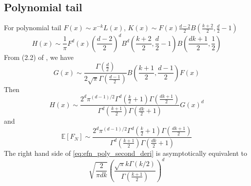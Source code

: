\documentclass{article}
\def\E{\mathbb{E}}
\begin{document}
\subsection{Polynomial tail}
For polynomial tail $F(x) \sim x^{-k} L(x)$,
$K(x) \sim F(x) \frac{d-2}{2} B\left(\frac{k+2}{2}, \frac{d}{2}-1\right)$
\begin{equation}
    H(x)
    \sim \frac{1}{\pi} F^d(x) \left(\frac{d-2}{2}\right)^d
    B^d\left(\frac{k+2}{2}, \frac{d}{2}-1\right)
    B\left(\frac{dk+1}{2}, \frac{1}{2}\right)
\end{equation}
From (2.2) of \cite{dwyer1991convex},
we have
\begin{equation}
    G(x) \sim \frac{\Gamma(\frac{d}{2})}{2\sqrt{\pi} \Gamma(\frac{d-1}{2})}
    B\left(\frac{k+1}{2}, \frac{d-1}{2}\right) F(x)
\end{equation}
Then
\begin{equation}
    H(x) \sim \frac{2^d \pi^{(d-1)/2}\Gamma^d(\frac{k}{2}+1)
    \Gamma(\frac{dk+1}{2})}{
        \Gamma^d(\frac{k+1}{2}) \Gamma(\frac{dk}{2}+1)} G(x)^d
\end{equation}
and
\begin{equation}\label{eq:efn_poly_second_deri}
    \E[F_N] \sim \frac{2^d \pi^{(d-1)/2}\Gamma^d(\frac{k}{2}+1)
    \Gamma(\frac{dk+1}{2})}{
        \Gamma^d(\frac{k+1}{2}) \Gamma(\frac{dk}{2}+1)}
\end{equation}
The right hand side of \eqref{eq:efn_poly_second_deri}
is asymptotically
equivalent to
$$
\sqrt{\frac{2}{\pi dk}}\left(
    \frac{\sqrt{\pi}k \Gamma(k/2)}
    {\Gamma(\frac{k+1}{2})}
\right)^d
$$
\end{document}
